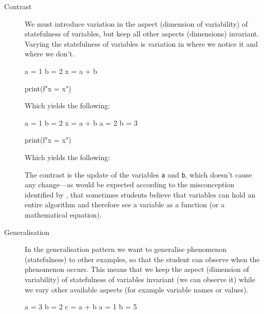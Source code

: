 \begin{description}
  \item [Contrast] We must introduce variation in the aspect (dimension of 
    variability) of statefulness of variables, but keep all other aspects 
    (dimensions) invariant.
    Varying the statefulness of variables is variation in where we notice it 
    and where we don't.

    \begin{minipage}[t]{0.45\columnwidth}
      \begin{pyblock}[varstateC1]
a = 1
b = 2
x = a + b



print(f"x = {x}")
      \end{pyblock}
      Which yields the following:
      \printpythontex[verbatim]
    \end{minipage}
    \hfill
    \begin{minipage}[t]{0.45\columnwidth}
      \begin{pyblock}[varstateC2][highlightlines={4-5}]
a = 1
b = 2
x = a + b
a = 2
b = 3

print(f"x = {x}")
      \end{pyblock}
      Which yields the following:
      \printpythontex[verbatim]
    \end{minipage}

    The contrast is the update of the variables \texttt{a} and 
    \texttt{b}, which doesn't cause any change---as would be 
    expected according to the misconception identified by
    \textcite{Kohn2017VariableEvaluation,Plass2015Variables,Doukakis2007}, that 
    sometimes students believe that variables can hold an entire algorithm and 
    therefore see a variable as a function (or a mathematical equation).

    \item [Generalisation] In the generalisation pattern we want to generalise 
      phenomenon (statefulness) to other examples, so that the student can 
      observe when the phenomenon occurs.
      This means that we keep the aspect (dimension of variability) of 
      statefulness of variables invariant (we can observe it) while we vary 
      other available aspects (for example variable names or values).
    
      \begin{minipage}[t]{0.45\columnwidth}
        \begin{pyblock}[varstateG1]
a = 3
b = 2
c = a + b
a = 1
b = 5


\end{pyblock}
\end{minipage}
\end{description}
